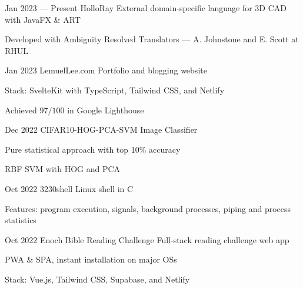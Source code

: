 \projectEntry
{Jan 2023 --- Present}
{HolloRay}
{External domain-specific language for 3D CAD with JavaFX \& ART}
{
\begin{descitemize}
	\item Developed with Ambiguity Resolved Translators --- A. Johnstone and E. Scott at RHUL
\end{descitemize}
}

\projectEntry
{Jan 2023}
{LemuelLee.com}
{Portfolio and blogging website}
{
\begin{descitemize}
    \item Stack: SvelteKit with TypeScript, Tailwind CSS, and Netlify
	\item Achieved $97/100$ in Google Lighthouse
\end{descitemize}
}

\projectEntry
{Dec 2022}
{CIFAR10-HOG-PCA-SVM}
{Image Classifier}
{
\begin{descitemize}
    \specialitem Pure statistical approach with top 10\% accuracy
    \item RBF SVM with HOG and PCA
\end{descitemize}
}


\projectEntry
{Oct 2022}
{3230shell}
{Linux shell in C}
{
\begin{descitemize}
    \item Features: program execution, signals, background processes, piping and process statistics
\end{descitemize}
}

\projectEntry
{Oct 2022}
{Enoch Bible Reading Challenge}
{Full-stack reading challenge web app}
{
\begin{descitemize}
	\item PWA \& SPA, instant installation on major OSs
    \item Stack: Vue.js, Tailwind CSS, Supabase, and Netlify
\end{descitemize}
}

